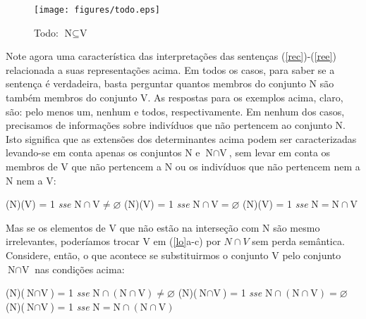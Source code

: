\begin{figure}[H]
\centerline{\texttt{[image: figures/todo.eps]}} \caption{Todo:
$\text{N}\subseteq\text{V}$}
\end{figure}

\n Note agora uma característica das interpretações das sentenças
(\ref{rec})-(\ref{ree}) relacionada a suas representações acima.
Em todos os casos, para saber se a sentença é verdadeira, basta
perguntar quantos membros do conjunto N são também membros do
conjunto V. As respostas para os exemplos acima, claro, são: pelo
menos um, nenhum e todos, respectivamente. Em nenhum dos casos,
precisamos de informações sobre indivíduos que não pertencem ao
conjunto N. Isto significa que as extensões dos determinantes
acima podem ser caracterizadas levando-se em conta apenas os
conjuntos N e $\text{N}\cap\text{V}$, sem levar em conta os
membros de V que não pertencem a N ou os indivíduos que não
pertencem nem a N nem a V:


\begin{exe}
    \ex\label{lo}
    \begin{xlist}
        \ex  {}(N)(V) = 1 \textit{sse}
            $\text{N}\cap\text{V}\neq\varnothing$\label{loa}
        \ex  {}(N)(V) = 1 \textit{sse}
            $\text{N}\cap\text{V}=\varnothing$\label{loz}
        \ex  {}(N)(V) = 1 \textit{sse}
            $\text{N}=\text{N}\cap\text{V}$\label{loc}
    \end{xlist}
\end{exe}

\n Mas se os elementos de V que não estão na interseção com N são mesmo irrelevantes, poderíamos trocar V em (\ref{lo}a-c) por $N \cap V$ sem perda semântica. Considere, então, o que acontece se substituirmos o conjunto V
pelo conjunto $\text{N}\cap\text{V}$ nas condições acima:


\begin{exe}
    \ex\label{clu}
    \begin{xlist}
        \ex  {}(N)($\text{N}\cap\text{V}$) = 1 \textit{sse}
            $\text{N}\cap (\text{N}\cap\text{V})\neq\varnothing$\label{clua}
        \ex  {}(N)($\text{N}\cap\text{V}$) = 1 \textit{sse}
            $\text{N}\cap (\text{N}\cap\text{V})=\varnothing $\label{cluz}
        \ex  {}(N)($\text{N}\cap\text{V}$) = 1 \textit{sse}
            $\text{N}=\text{N}\cap (\text{N}\cap\text{V})$\label{cluc}
    \end{xlist}
\end{exe}


